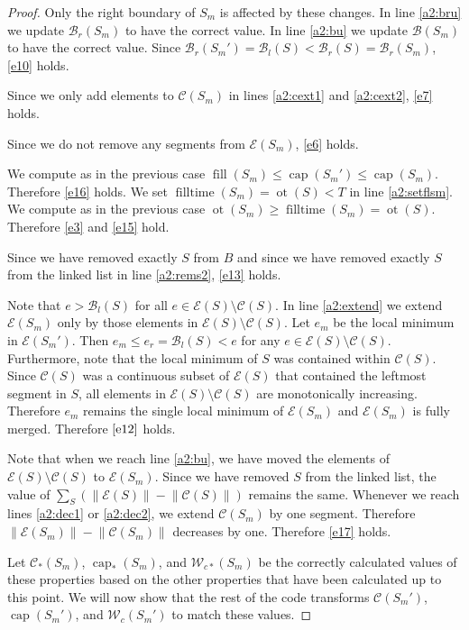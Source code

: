 \documentclass[11pt,a4paper]{article}
\newcommand{\norm}[1]{\left\lVert #1 \right\rVert}
\newcommand{\Br}{\mathcal{B}_r}
\newcommand{\Bl}{\mathcal{B}_l}
\newcommand{\B}{\mathcal{B}}
\newcommand{\Wc}{\mathcal{W}_c}
\newcommand{\W}{\mathcal{W}}
\newcommand{\C}{\mathcal{C}}
\newcommand{\E}{\mathcal{E}}
\DeclareMathOperator{\capp}{cap}
\DeclareMathOperator{\ot}{ot}
\DeclareMathOperator{\Fill}{fill}
\DeclareMathOperator{\filltime}{filltime}
\begin{document}
\begin{proof}
Only the right boundary of $S_m$ is affected by these changes.
In line \ref{a2:bru} we update $\Br(S_m)$ to have the correct value.
In line \ref{a2:bu} we update $\B(S_m)$ to have the correct value.
Since $\Br(S_m') = \Bl(S) < \Br(S) = \Br(S_m)$, \ref{e10} holds.

Since we only add elements to $\C(S_m)$ in lines \ref{a2:cext1} and \ref{a2:cext2}, \ref{e7} holds.

Since we do not remove any segments from $\E(S_m)$, \ref{e6} holds.

We compute as in the previous case $\Fill(S_m) \le \capp(S_m') \le \capp(S_m)$.
Therefore \ref{e16} holds.
We set $\filltime(S_m) = \ot(S) < T$ in line \ref{a2:setflsm}.
We compute as in the previous case $\ot(S_m)\ge\filltime(S_m)=\ot(S)$.
Therefore \ref{e3} and \ref{e15} hold.

Since we have removed exactly $S$ from $B$ and since we have removed exactly $S$ from the linked list in line \ref{a2:rems2}, \ref{e13} holds.

Note that $e > \Bl(S)$ for all $e\in\E(S)\setminus\C(S)$.
In line \ref{a2:extend} we extend $\E(S_m)$ only by those elements in $\E(S)\setminus\C(S)$.
Let $e_m$ be the local minimum in $\E(S_m')$.
Then $e_m\le e_r=\Bl(S)<e$ for any $e\in\E(S)\setminus\C(S)$.
Furthermore, note that the local minimum of $S$ was contained within $\C(S)$.
Since $\C(S)$ was a continuous subset of $\E(S)$ that contained the leftmost segment in $S$, all elements in $\E(S)\setminus\C(S)$ are monotonically increasing.
Therefore $e_m$ remains the single local minimum of $\E(S_m)$ and $\E(S_m)$ is fully merged.
Therefore $\ref{e12}$ holds.

Note that when we reach line \ref{a2:bu}, we have moved the elements of $\E(S)\setminus\C(S)$ to $\E(S_m)$.
Since we have removed $S$ from the linked list, the value of $\sum_S\left(\norm{\E(S)} - \norm{\C(S)}\right)$ remains the same.
Whenever we reach lines \ref{a2:dec1} or \ref{a2:dec2}, we extend $\C(S_m)$ by one segment.
Therefore $\norm{\E(S_m)} - \norm{\C(S_m)}$ decreases by one.
Therefore \ref{e17} holds.

Let $\C_*(S_m)$, $\capp_*(S_m)$, and $\W_{c*}(S_m)$ be the correctly calculated values of these properties based on the other properties that have been calculated up to this point.
We will now show that the rest of the code transforms $\C(S_m')$, $\capp(S_m')$, and $\Wc(S_m')$ to match these values.


\end{proof}
\end{document}
